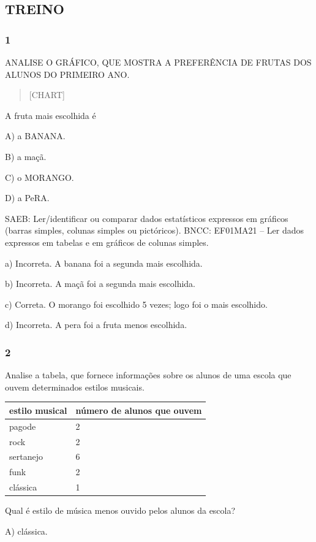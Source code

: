 \subsection{TREINO}\label{treino-6}

\subsubsection{1}\label{section-84}

ANALISE O GRÁFICO, QUE MOSTRA A PREFERÊNCIA DE FRUTAS DOS ALUNOS DO PRIMEIRO
ANO.

\begin{quote}
{{[}CHART{]}}
\end{quote}

A fruta mais escolhida é

A) a BANANA.

B) a maçã.

C) o MORANGO.

D) a PeRA.

SAEB: Ler/identificar ou comparar dados estatísticos expressos
em gráficos (barras simples, colunas simples ou pictóricos).
BNCC: EF01MA21 -- Ler dados expressos em tabelas e em gráficos de colunas
simples.

a) Incorreta. A banana foi a segunda mais escolhida.

b) Incorreta. A maçã foi a segunda mais escolhida.

c) Correta. O morango foi escolhido 5 vezes; logo foi o mais escolhido.

d) Incorreta. A pera foi a fruta menos escolhida.

\subsubsection{2}\label{section-85}

Analise a tabela, que fornece informações sobre os alunos de uma escola que ouvem determinados estilos musicais.

\begin{longtable}[]{@{}ll@{}}
\toprule
estilo musical & número de alunos que ouvem\tabularnewline
\midrule
\endhead
pagode & 2\tabularnewline
rock & 2\tabularnewline
sertanejo & 6\tabularnewline
funk & 2\tabularnewline
clássica & 1\tabularnewline
\bottomrule
\end{longtable}

Qual é estilo de música menos ouvido pelos alunos da escola?

A) clássica.

